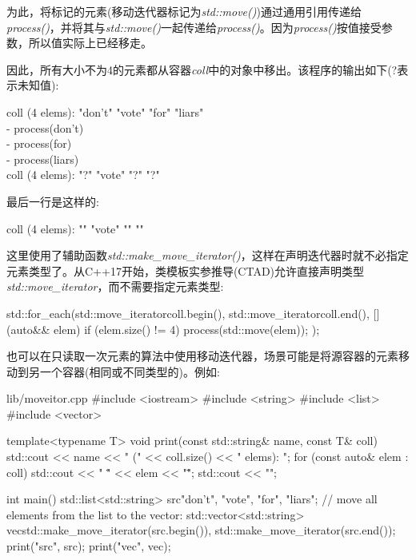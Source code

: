 为此，将标记的元素(移动迭代器标记为\textit{std::move()})通过通用引用传递给\textit{process()}，并将其与\textit{std::move()}一起传递给\textit{process()}。因为\textit{process()}按值接受参数，所以值实际上已经移走。\par

因此，所有大小不为4的元素都从容器\textit{coll}中的对象中移出。该程序的输出如下(?表示未知值):\par

\begin{myOutput}
coll (4 elems): "don't" "vote" "for" "liars" \\
- process(don't) \\
- process(for) \\
- process(liars) \\
coll (4 elems): "?" "vote" "?" "?"
\end{myOutput}

最后一行是这样的:\par

\begin{myOutput}
coll (4 elems): "" "vote" "" ""
\end{myOutput}

这里使用了辅助函数\textit{std::\allowbreak{}make\_\allowbreak{}move\_\allowbreak{}iterator(\allowbreak{})\allowbreak{}}，这样在声明迭代器时就不必指定元素类型了。从C++17开始，类模板实参推导(CTAD)允许直接声明类型\textit{std::\allowbreak{}move\_\allowbreak{}iterator}，而不需要指定元素类型:\par

\begin{codebox}[cpp]
std::for_each(std::move_iterator{coll.begin()},
std::move_iterator{coll.end()},
[] (auto&& elem) {
  if (elem.size() != 4) {
    process(std::move(elem));
  }
});
\end{codebox}


也可以在只读取一次元素的算法中使用移动迭代器，场景可能是将源容器的元素移动到另一个容器(相同或不同类型的)。例如:\par

\begin{codeboxt}[cpp]{lib/moveitor.cpp}
#include <iostream>
#include <string>
#include <list>
#include <vector>

template<typename T>
void print(const std::string& name, const T& coll)
{
  std::cout << name << " (" << coll.size() << " elems): ";
  for (const auto& elem : coll) {
    std::cout << " \"" << elem << "\"";
  }
  std::cout << "\n";
}

int main()
{
  std::list<std::string> src{"don't", "vote", "for", "liars"};
  // move all elements from the list to the vector:
  std::vector<std::string> vec{std::make_move_iterator(src.begin()),
    std::make_move_iterator(src.end())};
  print("src", src);
  print("vec", vec);
}
\end{codeboxt}

